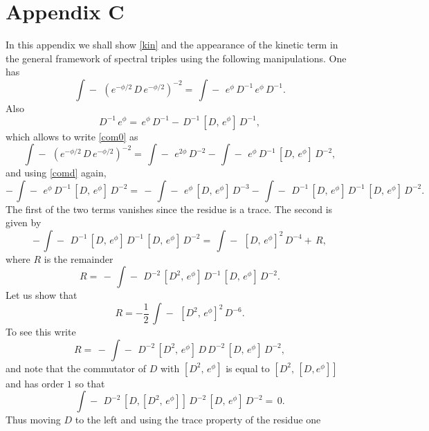 \documentclass[12pt]{article}%
\begin{document}
\section{Appendix C}

In this appendix we shall show \eqref{kin} and the appearance of the kinetic
term in the general framework of spectral triples using the following
manipulations. One has
\begin{equation}
\int\!\!\!\!\!\!-\ \,(e^{-\phi/2}\,D\,e^{-\phi/2})^{-2}=\,\int
\!\!\!\!\!\!-\ \,e^{\phi}\,D^{-1}\,e^{\phi}\,D^{-1}. \label{com0}%
\end{equation}
Also
\begin{equation}
D^{-1}\,e^{\phi}=\,e^{\phi}\,D^{-1}-\,D^{-1}\,[D,\,e^{\phi}]\,D^{-1},
\label{comd}%
\end{equation}
which allows to write \eqref{com0} as
\begin{equation}
\int\!\!\!\!\!\!-\ \,(e^{-\phi/2}\,D\,e^{-\phi/2})^{-2}=\,\int
\!\!\!\!\!\!-\ \,e^{2\phi}\,D^{-2}-\,\int\!\!\!\!\!\!-\ \,e^{\phi}%
\,D^{-1}\,[D,\,e^{\phi}]\,D^{-2}, \label{com1}%
\end{equation}
and using \eqref{comd} again,
\[
-\,\int\!\!\!\!\!\!-\ \,e^{\phi}\,D^{-1}\,[D,\,e^{\phi}]\,D^{-2}%
=\,-\,\int\!\!\!\!\!\!-\ \,e^{\phi}\,[D,\,e^{\phi}]\,D^{-3}-\,\int
\!\!\!\!\!\!-\ \,D^{-1}\,[D,\,e^{\phi}]\,D^{-1}\,[D,\,e^{\phi}]\,D^{-2}.
\]
The first of the two terms vanishes since the residue is a trace. The second
is given by
\begin{equation}
-\,\int\!\!\!\!\!\!-\ \,D^{-1}\,[D,\,e^{\phi}]\,D^{-1}\,[D,\,e^{\phi}%
]\,D^{-2}=\,\int\!\!\!\!\!\!-\ \,[D,\,e^{\phi}]^{2}\,D^{-4}+\,R, \label{com2}%
\end{equation}
where $R$ is the remainder
\[
R=\,-\,\int\!\!\!\!\!\!-\ \,D^{-2}\,[D^{2},\,e^{\phi}]\,D^{-1}\,[D,\,e^{\phi
}]\,D^{-2}.
\]
Let us show that
\begin{equation}
R=-\frac{1}{2}\,\int\!\!\!\!\!\!-\ \,[D^{2},\,e^{\phi}]^{2}\,D^{-6}.
\label{com4}%
\end{equation}
To see this write
\begin{equation}
R=\,-\,\int\!\!\!\!\!\!-\ \,D^{-2}\,[D^{2},\,e^{\phi}]\,D\,D^{-2}%
\,[D,\,e^{\phi}]\,D^{-2}, \label{com5}%
\end{equation}
and note that the commutator of $D$ with $[D^{2},\,e^{\phi}]$ is equal to
$[D^{2},\,[D,e^{\phi}]]$ and has order $1$ so that
\[
\int\!\!\!\!\!\!-\ \,D^{-2}\,[D,[D^{2},\,e^{\phi}]]\,D^{-2}\,[D,\,e^{\phi
}]\,D^{-2}=\,0.
\]
Thus moving $D$ to the left and using the trace property of the residue one
\end{document}
